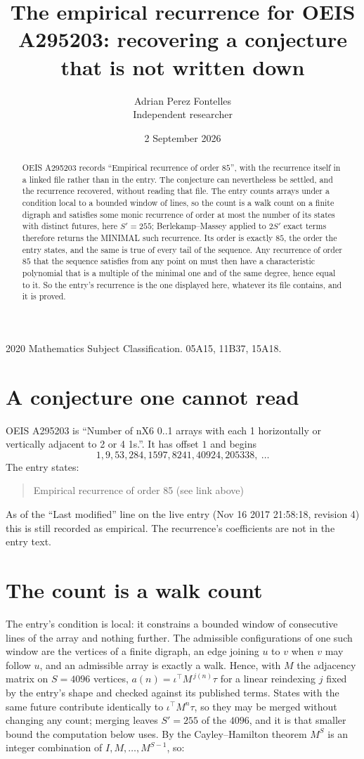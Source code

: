 \documentclass[11pt,a4paper]{article}
\title{The empirical recurrence for OEIS A295203: recovering a conjecture that is not written down}
\author{Adrian Perez Fontelles\\ \small Independent researcher}
\date{2 September 2026}
\theoremstyle{plain}
\theoremstyle{definition}
\begin{document}
\maketitle

\begin{abstract}
OEIS A295203 records ``Empirical recurrence of order $85$'', with the recurrence itself in a
linked file rather than in the entry. The conjecture can nevertheless be settled, and the
recurrence recovered, without reading that file. The entry counts arrays under a condition
local to a bounded window of lines, so the count is a walk count on a finite digraph and
satisfies some monic recurrence of order at most the number of its states with distinct
futures, here $S'=255$; Berlekamp--Massey applied to $2S'$ exact
terms therefore returns the MINIMAL such recurrence. Its order is exactly $85$, the order
the entry states, and the same is true of every tail of the sequence. Any recurrence of order
$85$ that the sequence satisfies from any point on must then have a characteristic
polynomial that is a multiple of the minimal one and of the same degree, hence equal to it. So
the entry's recurrence is the one displayed here, whatever its file contains, and it is
proved.
\end{abstract}

\noindent\small 2020 Mathematics Subject Classification. 05A15, 11B37, 15A18.\normalsize

\section{A conjecture one cannot read}

OEIS A295203 is ``Number of nX6 0..1 arrays with each 1 horizontally or vertically adjacent to 2 or 4 1s.''. It has offset $1$ and begins
\[
1, 9, 53, 284, 1597, 8241, 40924, 205338,\ \dots
\]
The entry states:
\begin{quote}
Empirical recurrence of order 85 (see link above)
\end{quote}
As of the ``Last modified'' line on the live entry (Nov 16 2017 21:58:18, revision 4) this is still
recorded as empirical. The recurrence's coefficients are not in the entry text.

\section{The count is a walk count}

The entry's condition is local: it constrains a bounded window of consecutive lines of the
array and nothing further. The admissible configurations of one such window are the vertices
of a finite digraph, an edge joining $u$ to $v$ when $v$ may follow $u$, and an admissible
array is exactly a walk. Hence, with $M$ the adjacency matrix on $S=4096$ vertices,
$a(n)=\iota^{\!\top}M^{\,j(n)}\tau$ for a linear reindexing $j$ fixed by the entry's shape
and checked against its published terms. States with the same future contribute identically to $\iota^{\!\top}M^n\tau$, so they may be merged without changing any count; merging leaves $S'=255$ of the $4096$, and it is that smaller bound the computation below uses. By the Cayley--Hamilton theorem $M^{S}$ is an
integer combination of $I,M,\dots,M^{S-1}$, so:
\end{document}
